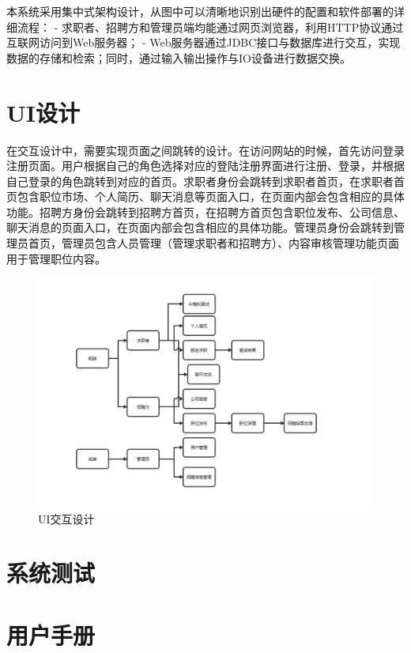 \documentclass[UTF8,a4paper,10pt]{ctexart}
\begin{document}
本系统采用集中式架构设计，从图中可以清晰地识别出硬件的配置和软件部署的详细流程：
- 求职者、招聘方和管理员端均能通过网页浏览器，利用HTTP协议通过互联网访问到Web服务器；
- Web服务器通过JDBC接口与数据库进行交互，实现数据的存储和检索；同时，通过输入输出操作与IO设备进行数据交换。

\section{UI设计}

在交互设计中，需要实现页面之间跳转的设计。在访问网站的时候，首先访问登录注册页面。用户根据自己的角色选择对应的登陆注册界面进行注册、登录，并根据自己登录的角色跳转到对应的首页。求职者身份会跳转到求职者首页，在求职者首页包含职位市场、个人简历、聊天消息等页面入口，在页面内部会包含相应的具体功能。招聘方身份会跳转到招聘方首页，在招聘方首页包含职位发布、公司信息、聊天消息的页面入口，在页面内部会包含相应的具体功能。管理员身份会跳转到管理员首页，管理员包含人员管理（管理求职者和招聘方）、内容审核管理功能页面用于管理职位内容。

\begin{figure}[H]
    \centering
    \includegraphics[width=\textwidth]{img/UI交互设计.png} 
    \caption{UI交互设计}
    \label{fig:UI交互设计}
\end{figure}

\section{系统测试}


\section{用户手册}
\end{document}
